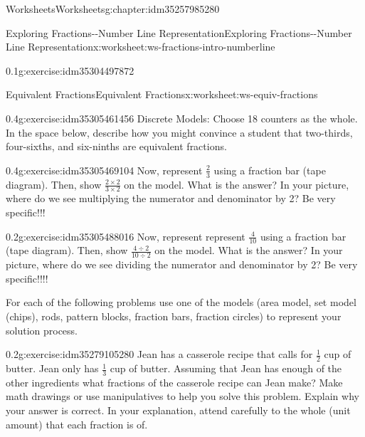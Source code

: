 \documentclass[twoside,11pt,]{book}
\begin{document}
\begin{chapterptx}{Worksheets}{}{Worksheets}{}{}{g:chapter:idm35257985280}
\begin{worksheet-section-numberless}{Exploring Fractions-{}-{}Number Line Representation}{}{Exploring Fractions-{}-{}Number Line Representation}{}{}{x:worksheet:ws-fractions-intro-numberline}
\begin{divisionexercise}{2}{}{0.1}{g:exercise:idm35304497872}
\end{divisionexercise}%
\end{worksheet-section-numberless}
\restoregeometry
%
%
\typeout{************************************************}
\typeout{************************************************}
%
\begin{worksheet-section-numberless}{Equivalent Fractions}{}{Equivalent Fractions}{}{}{x:worksheet:ws-equiv-fractions}
\begin{divisionexercise}{1}{}{0.4}{g:exercise:idm35305461456}%
Discrete Models: Choose 18 counters as the whole. In the space below, describe how you might convince a student that two-thirds, four-sixths, and six-ninths are equivalent fractions.%
\end{divisionexercise}%
\begin{divisionexercise}{2}{}{0.4}{g:exercise:idm35305469104}%
Now, represent \(\frac{2}{3} \) using a fraction bar (tape diagram). Then, show  \(\frac{2 \times 2}{3 \times 2} \) on the model. What is the answer? In your picture, where do we see multiplying the numerator and denominator by 2? Be very specific!!!%
\end{divisionexercise}%
\begin{divisionexercise}{3}{}{0.2}{g:exercise:idm35305488016}%
Now, represent represent \(\frac{4}{10} \) using a fraction bar (tape diagram). Then, show  \(\frac{4 \div 2}{10 \div 2} \) on the model. What is the answer? In your picture, where do we see dividing the numerator and denominator by 2? Be very specific!!!!%
\end{divisionexercise}%
\begin{introduction}{}%
For each of the following problems use one of the models (area model, set model (chips), rods, pattern blocks, fraction bars, fraction circles) to represent your solution process.%
\end{introduction}%
\begin{divisionexercise}{4}{}{0.2}{g:exercise:idm35279105280}%
Jean has a casserole recipe that calls for \(\frac{1}{2} \) cup of butter. Jean only has \(\frac{1}{3} \) cup of butter. Assuming that Jean has enough of the other ingredients what fractions of the casserole recipe can Jean make? Make math drawings or use manipulatives to help you solve this problem. Explain why your answer is correct. In your explanation, attend carefully to the whole (unit amount) that each fraction is of.%
\end{divisionexercise}%

\end{worksheet-section-numberless}
\end{chapterptx}
\end{document}
